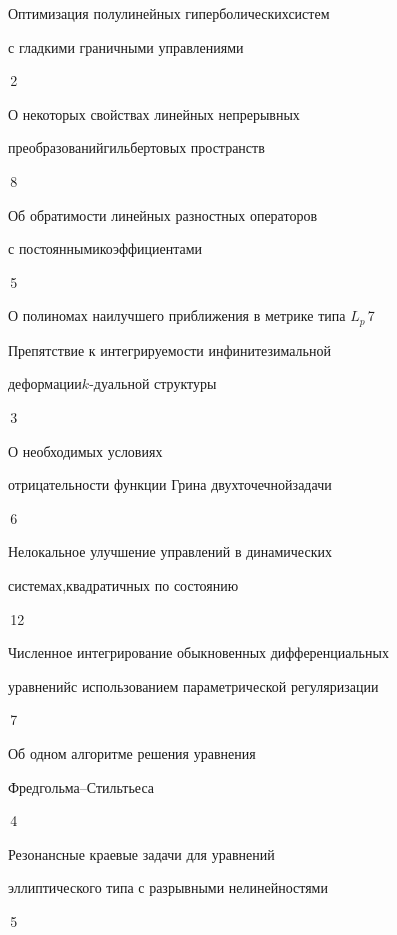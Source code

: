 

{Оптимизация полулинейных гиперболических\newline систем 


с гладкими граничными управлениями}{\No\,2}




{О некоторых свойствах линейных непрерывных 


преобразований\newline гильбертовых пространств}{\No\,8}




{Об обратимости линейных разностных операторов  


с постоянными\newline коэффициентами}{\No\,5}




{О полиномах наилучшего приближения в метрике типа $L_p$}{\No\,7}




{Препятствие к интегрируемости инфинитезимальной


деформации\newline $k$-дуальной структуры}{\No\,3}




{О необходимых условиях


отрицательности функции Грина двухточечной\newline задачи}{\No\,6}




{Нелокальное улучшение управлений в динамических 


системах,\newline квадратичных по состоянию}{\No\,12}




{Численное интегрирование обыкновенных дифференциальных  


уравнений\newline с использованием параметрической регуляризации}{\No\,7}




{Об одном алгоритме решения уравнения


Фредгольма--\newline Стильтьеса}{\No\,4}




{Резонансные краевые задачи для уравнений \newline


эллиптического типа с разрывными нелинейностями}{\No\,5}


